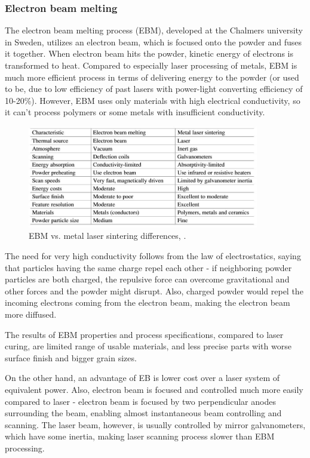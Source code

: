 \documentclass[a4paper, 11pt, reqno]{report}
\begin{document}
\subsubsection{Electron beam melting}
The electron beam melting process (EBM), developed at the Chalmers university in Sweden, utilizes an electron beam, which is focused onto the powder and fuses it together. When electron beam hits the powder, kinetic energy of electrons is transformed to heat. Compared to especially laser processing of metals, EBM is much more efficient process in terms of delivering energy to the powder (or used to be, due to low efficiency of past lasers with power-light converting efficiency of 10-20\%). However, EBM uses only materials with high electrical conductivity, so it can't process polymers or some metals with insufficient conductivity.\\
\begin{figure}[b]
	\centering
	\renewcommand\figurename{Tab.}
	\includegraphics[width=0.9\textwidth]{EbmMlsDifferences}
	\caption{EBM vs. metal laser sintering differences, \cite[p. 137]{AMT}.}
\end{figure}
	The need for very high conductivity follows from the law of electrostatics, saying that particles having the same charge repel each other - if neighboring powder particles are both charged, the repulsive force can overcome gravitational and other forces and the powder might disrupt. Also, charged powder would repel the incoming electrons coming from the electron beam, making the electron beam more diffused.
	
	The results of EBM properties and process specifications, compared to laser curing, are limited range of usable materials, and less precise parts with worse surface finish and bigger grain sizes.
	
	On the other hand, an advantage of EB is lower cost over a laser system of equivalent power. Also, electron beam is focused and controlled much more easily compared to laser - electron beam is focused by two perpendicular anodes surrounding the beam, enabling almost instantaneous beam controlling and scanning. The laser beam, however, is usually controlled by mirror galvanometers, which have some inertia, making laser scanning process slower than EBM processing.
	
\end{document}
